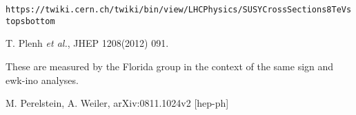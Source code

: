 \begin{thebibliography}{10}

 {\tt https://twiki.cern.ch/twiki/bin/view/LHCPhysics/SUSYCrossSections8TeVstopsbottom}

 T. Plenh {\em et al.}, JHEP 1208(2012) 091.

 These are measured by the Florida group in the context
  of the same sign and ewk-ino analyses.

  M. Perelstein, A. Weiler, arXiv:0811.1024v2 [hep-ph] 











    




\end{thebibliography}
